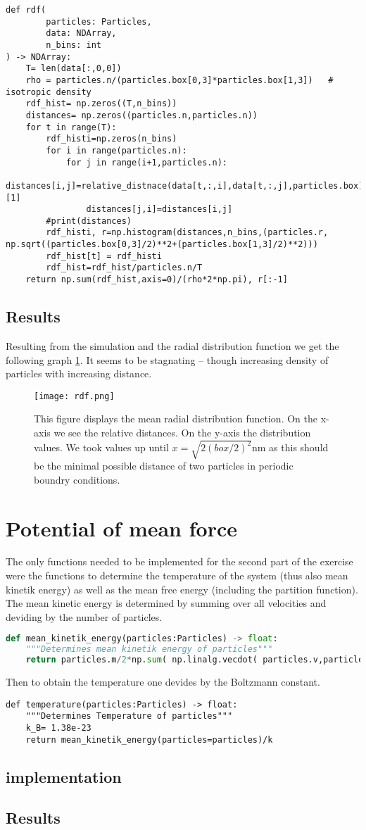 \documentclass{article}[a4paper]
\begin{document}
\begin{lstlisting}
def rdf(
        particles: Particles,
        data: NDArray,
        n_bins: int
) -> NDArray:
    T= len(data[:,0,0])
    rho = particles.n/(particles.box[0,3]*particles.box[1,3])   # isotropic density
    rdf_hist= np.zeros((T,n_bins))
    distances= np.zeros((particles.n,particles.n))
    for t in range(T):
        rdf_histi=np.zeros(n_bins)
        for i in range(particles.n):
            for j in range(i+1,particles.n):
                distances[i,j]=relative_distnace(data[t,:,i],data[t,:,j],particles.box)[1]
                distances[j,i]=distances[i,j]
        #print(distances)
        rdf_histi, r=np.histogram(distances,n_bins,(particles.r, np.sqrt((particles.box[0,3]/2)**2+(particles.box[1,3]/2)**2)))
        rdf_hist[t] = rdf_histi
        rdf_hist=rdf_hist/particles.n/T
    return np.sum(rdf_hist,axis=0)/(rho*2*np.pi), r[:-1]
\end{lstlisting}

\subsection{Results}
Resulting from the simulation and the radial distribution function we get the following graph \ref{fig:rdf}.
It seems to be stagnating -- though increasing density of particles with increasing distance.
\begin{figure}[h!]
    \centering
    \texttt{[image: rdf.png]}
    \caption{This figure displays the mean radial distribution function. On the x-axis we see the relative distances. On the y-axis the distribution values. We took values up until $x=\sqrt{2(\textit{box}/2)^2}$nm as this should be the minimal possible distance of two particles in periodic boundry conditions.} \label{fig:rdf}
\end{figure}


\section{Potential of mean force}
The only functions needed to be implemented for the second part of the exercise were the functions to determine the temperature of the system (thus also mean kinetik energy) as well as the mean free energy (including the partition function).
The mean kinetic energy is determined by summing over all velocities and deviding by the number of particles.
\begin{lstlisting}[language=Python]
def mean_kinetik_energy(particles:Particles) -> float:
    """Determines mean kinetik energy of particles"""
    return particles.m/2*np.sum( np.linalg.vecdot( particles.v,particles.v, axis=0))/particles.n
\end{lstlisting}
Then to obtain the temperature one devides by the Boltzmann constant.
\begin{lstlisting}
def temperature(particles:Particles) -> float:
    """Determines Temperature of particles"""
    k_B= 1.38e-23  
    return mean_kinetik_energy(particles=particles)/k
\end{lstlisting}


\subsection{implementation}
\subsection{Results}
\end{document}
